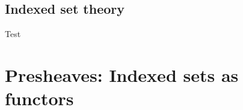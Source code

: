 \documentclass{../thesis-note}
\begin{document}
\subsection*{Indexed set theory}

Test

\section{Presheaves: Indexed sets as functors}

\newpage



\end{document}
